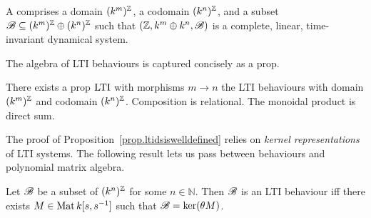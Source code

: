 
\begin{definition}
  A  comprises a domain
  $(k^m)^{\mathbb Z}$, a codomain $(k^n)^{\mathbb Z}$, and a subset ${\mathscr B} \subseteq (k^m)^{\mathbb Z}
  \oplus (k^n)^{\mathbb Z}$ such that $({\mathbb Z},k^m \oplus k^n,{\mathscr B})$ is a complete, linear,
  time-invariant dynamical system.
\end{definition}

The algebra of LTI behaviours is captured concisely as a prop.
\begin{proposition} \label{prop.ltidsiswelldefined}
  There exists a prop $\operatorname{\mathrm{LTI}}$ 
  with morphisms $m \to n$ the LTI behaviours with domain $(k^m)^{\mathbb Z}$ and
  codomain $(k^n)^{\mathbb Z}$. Composition is relational. The monoidal product is
  direct sum.
\end{proposition}



The proof of Proposition~\ref{prop.ltidsiswelldefined} relies on \emph{kernel
representations} of LTI  systems.  The following result lets us pass between
behaviours and polynomial matrix algebra.
%
%
\begin{theorem} \label{thm.kernelreps}
  Let ${\mathscr B}$ be a subset of $(k^n)^{\mathbb Z}$ for some $n \in \mathbb N$. Then ${\mathscr B}$ is
  an LTI behaviour iff there exists $M \in
  \operatorname{\mathrm{Mat}}{k[s,s^{-1}]}$ such that ${\mathscr B} = \mathrm{ker}(\theta M)$.
\end{theorem}


